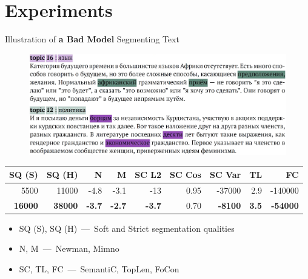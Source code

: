 \documentclass[russian]{beamer}
\begin{document}
\section{Experiments}


\begin{frame}{Illustration of \textbf{a Bad Model} Segmenting Text}
  \begin{figure}[h]
    \centering
    \includegraphics[width=\textwidth]{combine_bad.jpg}
  \end{figure}
  
  \vspace{-0.5cm}

  \begin{table}[h]
    \scriptsize
    \centering
    \begin{tabular}{rrrrrrrrr}
      SQ (S) & SQ (H) & N & M & SC L2 & SC Cos & SC Var & TL & FC\\
      \midrule
      \rowcolor{my-blue-light}
      5500 & 11000 & -4.8 & -3.1 & -13 & 0.95 & -37000 & 2.9 & -140000\\
      \textbf{16000} & \textbf{38000} & \textbf{-3.7} & \textbf{-2.7} & \textbf{-3.7} & 0.70 & \textbf{-8100} & \textbf{3.5} & \textbf{-54000}
    \end{tabular}
  \end{table}
  
  \begin{itemize}\setlength{\itemindent}{0pt}
    \small
    \item SQ (S), SQ (H)~---~Soft and Strict segmentation qualities
    \item N, M~---~Newman, Mimno
    \item SC, TL, FC~---~SemantiC, TopLen, FoCon
  \end{itemize}
\end{frame}
\end{document}
